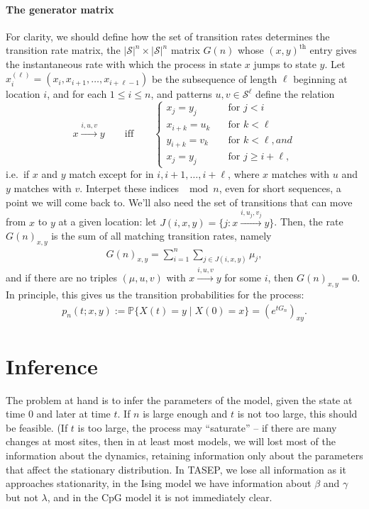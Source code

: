 \documentclass{article}
\renewcommand{\P}{\mathbb{P}}
\newcommand{\calS}{\mathcal{S}}  %
\newcommand{\st}{\colon}  %
\theoremstyle{definition}
\begin{document}
\paragraph{The generator matrix}
For clarity, we should define how the set of transition rates determines the transition rate matrix,
the $|\calS|^n \times |\calS|^n$ matrix $G(n)$ whose $(x,y)^\text{th}$ entry gives the instantaneous rate 
with which the process in state $x$ jumps to state $y$.
Let $x_i^{(\ell)} = (x_i, x_{i+1}, \ldots, x_{i+\ell-1})$ be the subsequence of length $\ell$ beginning at location $i$,
and for each $1\le i \le n$, and patterns $u,v \in \calS^\ell$ define the relation
\[
x \xrightarrow{i,u,v} y \qquad \text{iff} \qquad \begin{cases}
  x_j = y_j \quad &\text{for } j<i \\
  x_{i+k} = u_k \quad &\text{for } k < \ell \\
  y_{i+k} = v_k \quad &\text{for } k < \ell, and \\
  x_j = y_j \quad &\text{for } j\ge i+\ell ,
\end{cases}
\]
i.e.\ if $x$ and $y$ match except for in $i,i+1,\ldots,i+\ell$, where $x$ matches with $u$ and $y$ matches with $v$.
Interpet these indices $\mod n$, even for short sequences, a point we will come back to.
We'll also need the set of transitions that can move from $x$ to $y$ at a given location: let  $J(i,x,y) = \{ j \st x \xrightarrow{i,u_j,v_j} y \}$.
Then, the rate $G(n)_{x,y}$ is the sum of all matching transition rates,
namely
\begin{align*}
  G(n)_{x,y} = \sum_{i=1}^n \sum_{j \in J(i,x,y)}  \mu_j ,
\end{align*}
and if there are no triples $(\mu,u,v)$ with $x \xrightarrow{i,u,v} y$ for some $i$, then $G(n)_{x,y}=0$.
In principle, this gives us the transition probabilities for the process:
\begin{align} \label{eqn:full_likelihood}
  p_n(t;x,y) := \P\{ X(t) = y \mid X(0) = x \} = (e^{tG_n})_{xy} .
\end{align}


\section{Inference}

The problem at hand is to infer the parameters of the model, given the state at time 0 and later at time $t$.
If $n$ is large enough and $t$ is not too large,
this should be feasible.
(If $t$ is too large, the process may ``saturate'' --
if there are many changes at most sites, then in at least most models, 
we will lost most of the information about the dynamics,
retaining information only about the parameters that affect the stationary distribution.
In TASEP, we lose all information as it approaches stationarity,
in the Ising model we have information about $\beta$ and $\gamma$ but not $\lambda$,
and in the CpG model it is not immediately clear.
\end{document}
